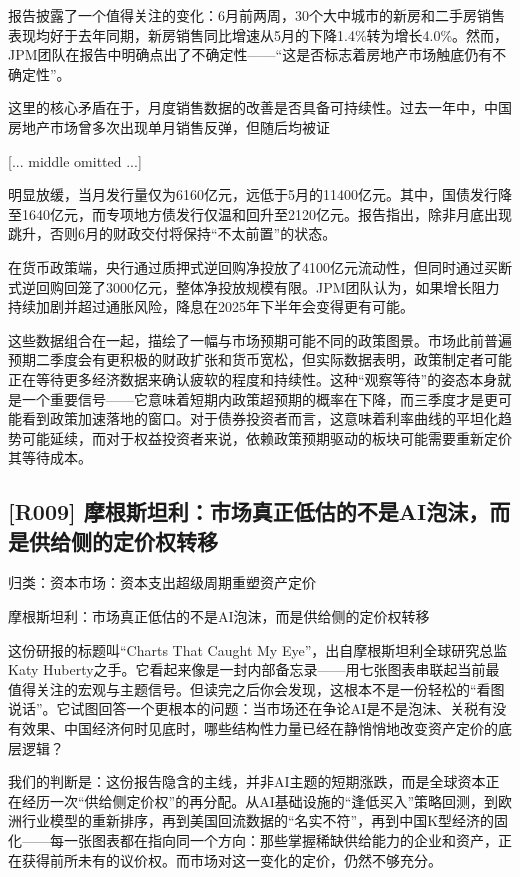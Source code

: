 \documentclass[11pt]{ctexart}
\begin{document}
报告披露了一个值得关注的变化：6月前两周，30个大中城市的新房和二手房销售表现均好于去年同期，新房销售同比增速从5月的下降1.4\%转为增长4.0\%。然而，JPM团队在报告中明确点出了不确定性——“这是否标志着房地产市场触底仍有不确定性”。

这里的核心矛盾在于，月度销售数据的改善是否具备可持续性。过去一年中，中国房地产市场曾多次出现单月销售反弹，但随后均被证

[... middle omitted ...]

明显放缓，当月发行量仅为6160亿元，远低于5月的11400亿元。其中，国债发行降至1640亿元，而专项地方债发行仅温和回升至2120亿元。报告指出，除非月底出现跳升，否则6月的财政交付将保持“不太前置”的状态。

在货币政策端，央行通过质押式逆回购净投放了4100亿元流动性，但同时通过买断式逆回购回笼了3000亿元，整体净投放规模有限。JPM团队认为，如果增长阻力持续加剧并超过通胀风险，降息在2025年下半年会变得更有可能。

这些数据组合在一起，描绘了一幅与市场预期可能不同的政策图景。市场此前普遍预期二季度会有更积极的财政扩张和货币宽松，但实际数据表明，政策制定者可能正在等待更多经济数据来确认疲软的程度和持续性。这种“观察等待”的姿态本身就是一个重要信号——它意味着短期内政策超预期的概率在下降，而三季度才是更可能看到政策加速落地的窗口。对于债券投资者而言，这意味着利率曲线的平坦化趋势可能延续，而对于权益投资者来说，依赖政策预期驱动的板块可能需要重新定价其等待成本。

\subsection{[R009] 摩根斯坦利：市场真正低估的不是AI泡沫，而是供给侧的定价权转移}
{\small\color{refgray}归类：资本市场：资本支出超级周期重塑资产定价}

摩根斯坦利：市场真正低估的不是AI泡沫，而是供给侧的定价权转移

这份研报的标题叫“Charts That Caught My Eye”，出自摩根斯坦利全球研究总监Katy Huberty之手。它看起来像是一封内部备忘录——用七张图表串联起当前最值得关注的宏观与主题信号。但读完之后你会发现，这根本不是一份轻松的“看图说话”。它试图回答一个更根本的问题：当市场还在争论AI是不是泡沫、关税有没有效果、中国经济何时见底时，哪些结构性力量已经在静悄悄地改变资产定价的底层逻辑？

我们的判断是：这份报告隐含的主线，并非AI主题的短期涨跌，而是全球资本正在经历一次“供给侧定价权”的再分配。从AI基础设施的“逢低买入”策略回测，到欧洲行业模型的重新排序，再到美国回流数据的“名实不符”，再到中国K型经济的固化——每一张图表都在指向同一个方向：那些掌握稀缺供给能力的企业和资产，正在获得前所未有的议价权。而市场对这一变化的定价，仍然不够充分。
\end{document}
